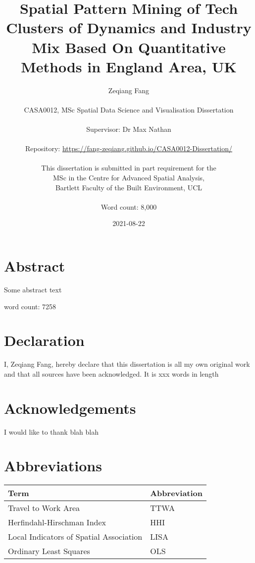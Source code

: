 \documentclass[
  12pt,
  oneside]{book}
\title{Spatial Pattern Mining of Tech Clusters of Dynamics and Industry Mix Based On Quantitative Methods in England Area, UK}
\author{Zeqiang Fang\\
~\\
CASA0012, MSc Spatial Data Science and Visualisation Dissertation\\
~\\
Supervisor: Dr Max Nathan\\
~\\
Repository: \url{https://fang-zeqiang.github.io/CASA0012-Dissertation/}\\
~\\
This dissertation is submitted in part requirement for the\\
MSc in the Centre for Advanced Spatial Analysis,\\
Bartlett Faculty of the Built Environment, UCL\\
~\\
Word count: 8,000}
\date{2021-08-22}
\begin{document}
\maketitle


\hypertarget{abstract}{%
\chapter*{Abstract}\label{abstract}}

Some abstract text

word count: 7258


\hypertarget{declaration}{%
\chapter*{Declaration}\label{declaration}}

I, Zeqiang Fang, hereby declare that this dissertation is all my own original work and that all sources have been acknowledged. It is xxx words in length

\hypertarget{acknowledgements}{%
\chapter*{Acknowledgements}\label{acknowledgements}}

I would like to thank blah blah

\setcounter{tocdepth}{3}
\tableofcontents
\listoffigures
\listoftables

\hypertarget{abbreviations}{%
\chapter*{Abbreviations}\label{abbreviations}}

\begin{table}
\centering
\begin{tabular}{ll}
\toprule
\textbf{Term} & \textbf{Abbreviation}\\
\midrule
Travel to Work Area & TTWA\\
Herfindahl-Hirschman Index & HHI\\
Local Indicators of Spatial Association & LISA\\
Ordinary Least Squares & OLS\\
\bottomrule
\end{tabular}
\end{table}
\end{document}
